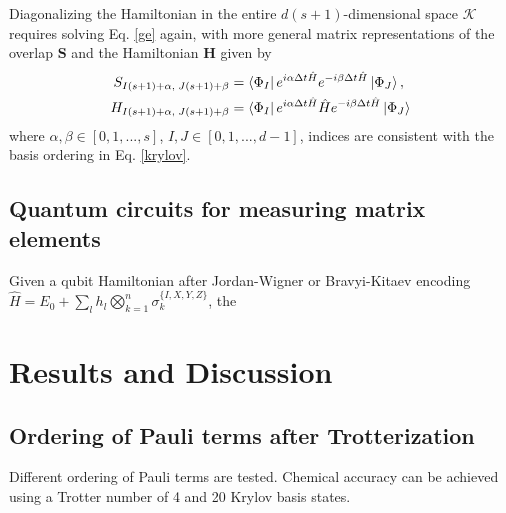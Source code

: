 \documentclass[journal=jctcce,manuscript=article]{achemso}
\begin{document}
Diagonalizing the Hamiltonian in the entire $d(s+1)$-dimensional space $\mathcal{K}$ requires solving Eq. \ref{ge} again, with more general matrix representations of the overlap $\mathbf{S}$ and the Hamiltonian $\mathbf{H}$ given by
\begin{align}
\label{overlap_eq}
S_{I(s+1)+\alpha,\; J(s+1)+\beta} &= \left\langle{\Phi_I}\right\vert e^{i \alpha \Delta t \hat{H}} e^{-i \beta \Delta t \hat{H}} \left\vert{\Phi_J}\right\rangle, \\
\label{hamiltonian_eq}
H_{I(s+1)+\alpha,\; J(s+1)+\beta} &= \left\langle{\Phi_I}\right\vert e^{i \alpha \Delta t \hat{H}} \hat{H} e^{-i \beta \Delta t \hat{H}} \left\vert{\Phi_J}\right\rangle
\end{align}
where $\alpha, \beta \in [0,1,...,s]$, $I, J \in [0,1,...,d-1]$, indices are consistent with the basis ordering in Eq. \ref{krylov}. 


\subsection{Quantum circuits for measuring matrix elements} Given a qubit Hamiltonian after Jordan-Wigner\cite{jordan1993paulische} or Bravyi-Kitaev encoding\cite{Seeley:2012em}  $\hat{H}=E_{0}+\sum_{l} h_{l} \bigotimes_{k=1}^{n} \sigma_{k}^{\{I, X, Y, Z\}}$, the 








\section{Results and Discussion}

\subsection{Ordering of Pauli terms after Trotterization}

Different ordering of Pauli terms are tested.
Chemical accuracy can be achieved using a Trotter number of 4 and 20 Krylov basis states.
\end{document}
